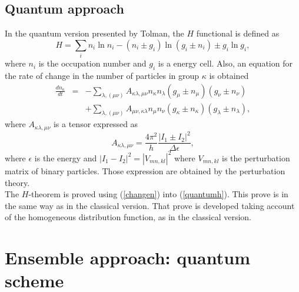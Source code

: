 \documentclass{article}
\begin{document}
\subsection{Quantum approach}
In the quantum version presented by Tolman, the $H$ functional is defined as 
\begin{equation}
    H=\sum_i n_i \ln n_i -(n_i\pm g_i)\ln (g_i \pm n_i)\pm g_i\ln g_i, \label{quantumh}
\end{equation}
where $n_i$ is the occupation number and $g_i$ is a energy cell. Also, an equation for the rate of change in the number of particles in group $\kappa$ is obtained
\begin{eqnarray}
    \frac{d n_{\kappa}}{dt}&=&-\sum_{\lambda,(\mu \nu)}A_{\kappa\lambda,\mu\nu} n_{\kappa}n_{\lambda}(g_{\mu}\pm n_{\mu})(g_{\nu}\pm n_{\nu})\nonumber \\
    &&+\sum_{\lambda,(\mu \nu)}A_{\mu\nu,\kappa\lambda} n_{\mu}n_{\nu}(g_{\kappa}\pm n_{\kappa})(g_{\lambda}\pm n_{\lambda}),\label{changen}
\end{eqnarray}
where $A_{\kappa\lambda,\mu\nu}$ is a tensor expressed as
\begin{equation}
  A_{\kappa\lambda,\mu\nu}=\frac{4\pi^{2}}{h}\frac{|I_1\pm I_2|^2}{\Delta \epsilon},
\end{equation}
where $\epsilon$ is the energy and $|I_1-I_2|^2=|V_{mn,kl}|^2$ where $V_{mn,kl}$ is the perturbation matrix of binary particles. Those expression are obtained by the perturbation theory.\\
The $H$-theorem is proved using (\ref{changen}) into (\ref{quantumh}). This prove is in the same way as in the classical version.  That prove is developed taking account of the homogeneous distribution function, as in the classical version.
\section{Ensemble approach: quantum scheme}
\end{document}
